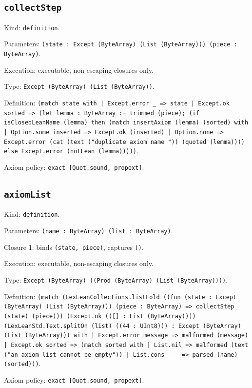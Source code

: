 \documentclass[11pt]{article}
\begin{document}
\subsection*{\texttt{collectStep}}
\noindent Kind: \texttt{definition}.\par
\noindent Parameters: \texttt{(state : Except (ByteArray) (List (ByteArray))) (piece : ByteArray)}.\par
\noindent Execution: executable, non-escaping closures only.\par
\noindent Type: \texttt{Except (ByteArray) (List (ByteArray))}.\par
\noindent Definition: \texttt{(match state with | Except.error \_ => state | Except.ok sorted => (let lemma : ByteArray := trimmed (piece); (if isClosedLeanName (lemma) then (match insertAxiom (lemma) (sorted) with | Option.some inserted => Except.ok (inserted) | Option.none => Except.error (cat (text ("duplicate axiom name ")) (quoted (lemma)))) else Except.error (notLean (lemma)))))}.\par
\noindent Axiom policy: \texttt{exact [Quot.sound, propext]}.\par
\subsection*{\texttt{axiomList}}
\noindent Kind: \texttt{definition}.\par
\noindent Parameters: \texttt{(name : ByteArray) (list : ByteArray)}.\par
\noindent Closure 1: binds \texttt{(state, piece)}, captures \texttt{()}.\par
\noindent Execution: executable, non-escaping closures only.\par
\noindent Type: \texttt{Except (ByteArray) ((Prod (ByteArray) (List (ByteArray))))}.\par
\noindent Definition: \texttt{(match (LexLeanCollections.listFold ((fun (state : Except (ByteArray) (List (ByteArray))) (piece : ByteArray) => collectStep (state) (piece))) (Except.ok (([] : List (ByteArray)))) (LexLeanStd.Text.splitOn (list) ((44 : UInt8))) : Except (ByteArray) (List (ByteArray))) with | Except.error message => malformed (message) | Except.ok sorted => (match sorted with | List.nil => malformed (text ("an axiom list cannot be empty")) | List.cons \_ \_ => parsed (name) (sorted)))}.\par
\noindent Axiom policy: \texttt{exact [Quot.sound, propext]}.\par
\end{document}
